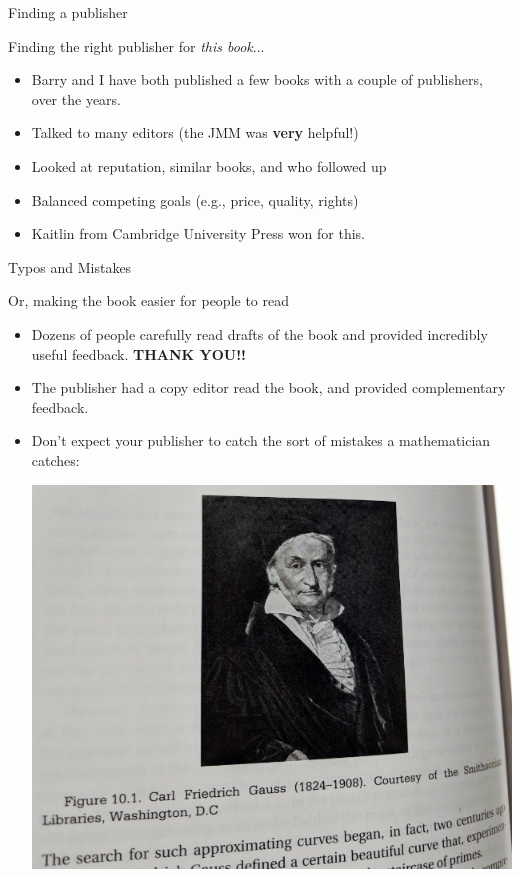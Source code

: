 \documentclass{beamer}
\begin{document}
\begin{frame}{Finding a publisher}
  \begin{block}{Finding the right publisher for {\em this book}...}
    \begin{itemize}
      \item Barry and I have both published a few books with a couple of publishers, over the years.
      \item Talked to many editors (the JMM was \textbf{very} helpful!)
      \item Looked at reputation, similar books, and who followed up
      \item Balanced competing goals (e.g., price, quality, rights)
      \item Kaitlin from Cambridge University Press won for this.
    \end{itemize}
  \end{block}
\end{frame}


\begin{frame}{Typos and Mistakes}
  \begin{block}{Or, making the book easier for people to read}
    \begin{itemize}
      \item Dozens of people carefully read drafts of
            the book and provided incredibly useful feedback.
            \textbf{THANK YOU!!}
      \item The publisher had a copy editor read the book,
            and provided complementary feedback.
      \item Don't expect your publisher to catch the sort of
            mistakes a mathematician catches:
            \begin{center}
              \includegraphics[height=.45\textheight]{pics/gauss}
            \end{center}
    \end{itemize}
  \end{block}
\end{frame}
\end{document}
